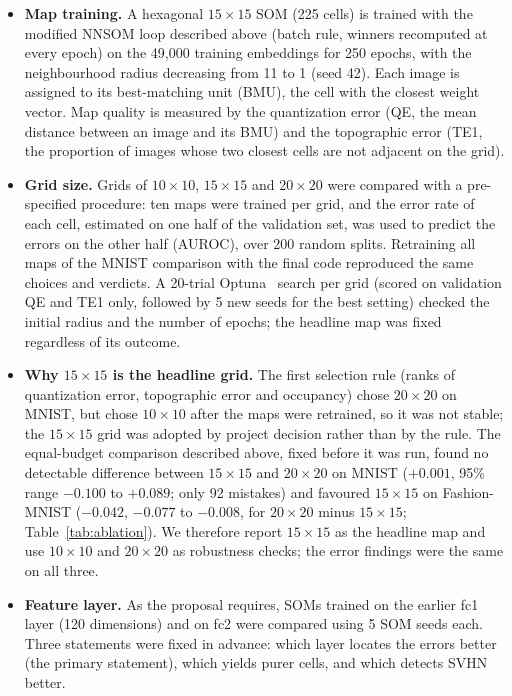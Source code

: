 \documentclass{scrartcl}
\begin{document}
\begin{itemize}
  \item \textbf{Map training.} A hexagonal $15\times15$ SOM (225 cells) is trained with the modified NNSOM loop described above (batch rule, winners recomputed at every epoch) on the 49,000 training embeddings for 250 epochs, with the neighbourhood radius decreasing from 11 to 1 (seed 42). Each image is assigned to its best-matching unit (BMU), the cell with the closest weight vector. Map quality is measured by the quantization error (QE, the mean distance between an image and its BMU) and the topographic error (TE1, the proportion of images whose two closest cells are not adjacent on the grid).
  \item \textbf{Grid size.} Grids of $10\times10$, $15\times15$ and $20\times20$ were compared with a pre-specified procedure: ten maps were trained per grid, and the error rate of each cell, estimated on one half of the validation set, was used to predict the errors on the other half (AUROC), over 200 random splits. Retraining all maps of the MNIST comparison with the final code reproduced the same choices and verdicts. A 20-trial Optuna~\cite{akiba2019optuna} search per grid (scored on validation QE and TE1 only, followed by 5 new seeds for the best setting) checked the initial radius and the number of epochs; the headline map was fixed regardless of its outcome.
  \item \textbf{Why $15\times15$ is the headline grid.} The first selection rule (ranks of quantization error, topographic error and occupancy) chose $20\times20$ on MNIST, but chose $10\times10$ after the maps were retrained, so it was not stable; the $15\times15$ grid was adopted by project decision rather than by the rule. The equal-budget comparison described above, fixed before it was run, found no detectable difference between $15\times15$ and $20\times20$ on MNIST ($+0.001$, 95\% range $-0.100$ to $+0.089$; only 92 mistakes) and favoured $15\times15$ on Fashion-MNIST ($-0.042$, $-0.077$ to $-0.008$, for $20\times20$ minus $15\times15$; Table~\ref{tab:ablation}). We therefore report $15\times15$ as the headline map and use $10\times10$ and $20\times20$ as robustness checks; the error findings were the same on all three.
  \item \textbf{Feature layer.} As the proposal requires, SOMs trained on the earlier fc1 layer (120 dimensions) and on fc2 were compared using 5 SOM seeds each. Three statements were fixed in advance: which layer locates the errors better (the primary statement), which yields purer cells, and which detects SVHN better.

\end{itemize}
\end{document}
